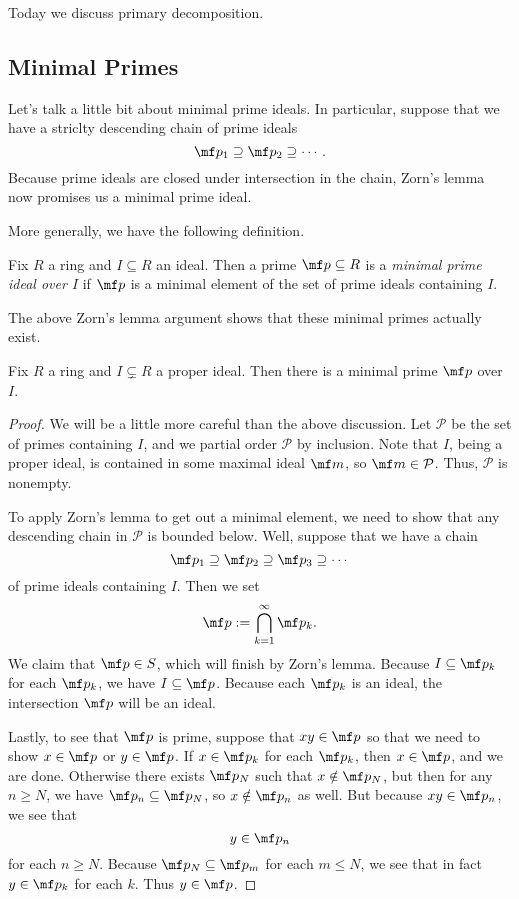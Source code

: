 
Today we discuss primary decomposition.

\subsection{Minimal Primes}

Let's talk a little bit about minimal prime ideals. In particular, suppose that we have a striclty descending chain of prime ideals
\[\mf p_1\supseteq\mf p_2\supseteq\cdots.\]
Because prime ideals are closed under intersection in the chain, Zorn's lemma now promises us a minimal prime ideal.

More generally, we have the following definition.
\begin{definition}
	Fix $R$ a ring and $I\subseteq R$ an ideal. Then a prime $\mf p\subseteq R$ is a \textit{minimal prime ideal over $I$} if $\mf p$ is a minimal element of the set of prime ideals containing $I$.
\end{definition}
The above Zorn's lemma argument shows that these minimal primes actually exist.
\begin{proposition} \label{prop:minprimeexist}
	Fix $R$ a ring and $I\subsetneq R$ a proper ideal. Then there is a minimal prime $\mf p$ over $I$.
\end{proposition}
\begin{proof}
	We will be a little more careful than the above discussion. Let $\mathcal P$ be the set of primes containing $I$, and we partial order $\mathcal P$ by inclusion. Note that $I$, being a proper ideal, is contained in some maximal ideal $\mf m$, so $\mf m\in\mathcal P$. Thus, $\mathcal P$ is nonempty.

	To apply Zorn's lemma to get out a minimal element, we need to show that any descending chain in $\mathcal P$ is bounded below. Well, suppose that we have a chain
	\[\mf p_1\supseteq\mf p_2\supseteq\mf p_3\supseteq\cdots\]
	of prime ideals containing $I$. Then we set
	\[\mf p:=\bigcap_{k=1}^\infty\mf p_k.\]
	We claim that $\mf p\in S$, which will finish by Zorn's lemma. Because $I\subseteq\mf p_k$ for each $\mf p_k$, we have $I\subseteq\mf p$. Because each $\mf p_k$ is an ideal, the intersection $\mf p$ will be an ideal.
	
	Lastly, to see that $\mf p$ is prime, suppose that $xy\in\mf p$ so that we need to show $x\in\mf p$ or $y\in\mf p$. If $x\in\mf p_k$ for each $\mf p_k$, then $x\in\mf p$, and we are done. Otherwise there exists $\mf p_N$ such that $x\notin\mf p_N$, but then for any $n\ge N$, we have $\mf p_n\subseteq\mf p_N$, so $x\notin\mf p_n$ as well. But because $xy\in\mf p_n$, we see that
	\[y\in\mf p_n\]
	for each $n\ge N$. Because $\mf p_N\subseteq\mf p_m$ for each $m\le N$, we see that in fact $y\in\mf p_k$ for each $k$. Thus $y\in\mf p$.
\end{proof}

